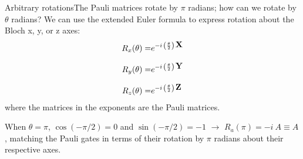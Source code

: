 \begin{frame}{Arbitrary rotations}{The Pauli matrices rotate by $\pi$ radians;  how can we rotate by $\theta$ radians?}
We can use the extended Euler formula to express rotation about the Bloch x, y, or z axes:
\begin{align*}
R_{x}(\theta) = & e^{-i\,\left(\frac{\theta}{2}\right)\,\mbox{\bfseries{\textrm{X}}}{}}\\[0.7em]
R_{y}(\theta) = & e^{-i\,\left(\frac{\theta}{2}\right)\,\mbox{\bfseries{\textrm{Y}}}{}}\\[0.7em]
R_{z}(\theta) = & e^{-i\,\left(\frac{\theta}{2}\right)\,\mbox{\bfseries{\textrm{Z}}}{}}
\end{align*}
where the matrices in the exponents are the Pauli matrices.

When $\theta=\pi$, $\cos(-\pi/2)=0$ and $\sin(-\pi/2)=-1$ $\rightarrow$ $R_a(\pi) = -i\ A \equiv A$, matching the Pauli gates in terms of their rotation by $\pi$ radians about their respective axes.
\end{frame}